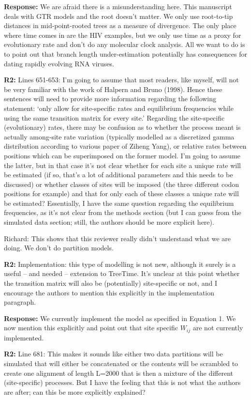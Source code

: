 \documentclass[aps,rmp,onecolumn]{revtex4-1}
\newcommand{\Richard}[1]{{\color{drab}Richard: #1}}
\newcommand{\refb}[1]{\textbf{R2:} #1}
\newcommand{\response}[1]{{\color{black}\textbf{Response:} #1}}
\begin{document}
\response{
We are afraid there is a misunderstanding here.
This manuscript deals with GTR models and the root doesn't matter.
We only use root-to-tip distances in mid-point-rooted trees as a measure of divergence.
The only place where time comes in are the HIV examples, but we only use time as a proxy for evolutionary rate and don't do any molecular clock analysis.
All we want to do is to point out that branch length under-estimation potentially has consequences for dating rapidly evolving RNA viruses.}


\refb{Lines 651-653: I’m going to assume that most readers, like myself, will not be very familiar with the work of Halpern and Bruno (1998). Hence these sentences will need to provide more information regarding the following statement: ‘only allow for site-specific rates and equilibrium frequencies while using the same transition matrix for every site.’ Regarding the site-specific (evolutionary) rates, there may be confusion as to whether the process meant is actually among-site rate variation (typically modelled as a discretized gamma distribution according to various paper of Ziheng Yang), or relative rates between positions which can be superimposed on the former model. I’m going to assume the latter, but in that case it’s not clear whether for each site a unique rate will be estimated (if so, that’s a lot of additional parameters and this needs to be discussed) or whether classes of sites will be imposed (the three different codon positions for example) and that for only each of these classes a unique rate will be estimated? Essentially, I have the same question regarding the equilibrium frequencies, as it’s not clear from the methods section (but I can guess from the simulated data section; still, the authors should be more explicit here).}

\Richard{This shows that this reviewer really didn't understand what we are doing. We don't do partition models. }


\refb{Implementation: this type of modelling is not new, although it surely is a useful -- and needed -- extension to TreeTime. It’s unclear at this point whether the transition matrix will also be (potentially) site-specific or not, and I encourage the authors to mention this explicitly in the implementation paragraph.}

\response{We currently implement the model as specified in Equation 1. We now mention this explicitly and point out that site specific $W_{ij}$ are not currently implemented.}


\refb{Line 681: This makes it sounds like either two data partitions will be simulated that will either be concatenated or the contents will be scrambled to create one alignment of length L=2000 that is then a mixture of the different (site-specific) processes. But I have the feeling that this is not what the authors are after; can this be more explicitly explained?}
\end{document}
